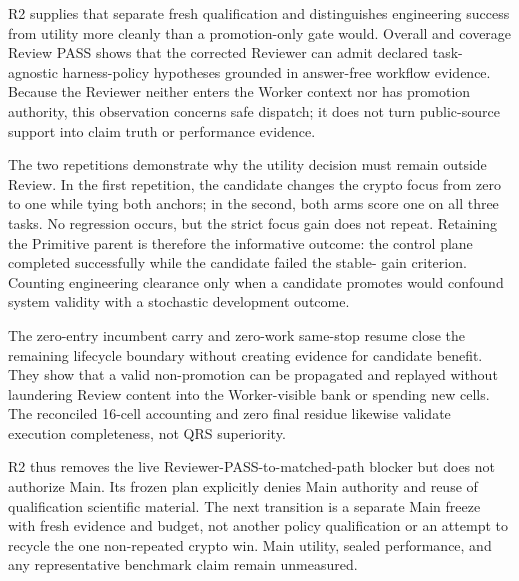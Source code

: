 R2 supplies that separate fresh qualification and distinguishes engineering
success from utility more cleanly than a promotion-only gate would. Overall
and coverage Review PASS shows that the corrected Reviewer can admit declared
task-agnostic harness-policy hypotheses grounded in answer-free workflow
evidence. Because the Reviewer neither enters the Worker context nor has
promotion authority, this observation concerns safe dispatch; it does not
turn public-source support into claim truth or performance evidence.

The two repetitions demonstrate why the utility decision must remain outside
Review. In the first repetition, the candidate changes the crypto focus from
zero to one while tying both anchors; in the second, both arms score one on all
three tasks. No regression occurs, but the strict focus gain does not repeat.
Retaining the Primitive parent is therefore the informative outcome: the
control plane completed successfully while the candidate failed the stable-
gain criterion. Counting engineering clearance only when a candidate promotes
would confound system validity with a stochastic development outcome.

The zero-entry incumbent carry and zero-work same-stop resume close the
remaining lifecycle boundary without creating evidence for candidate benefit.
They show that a valid non-promotion can be propagated and replayed without
laundering Review content into the Worker-visible bank or spending new cells.
The reconciled 16-cell accounting and zero final residue likewise validate
execution completeness, not QRS superiority.

R2 thus removes the live Reviewer-PASS-to-matched-path blocker but does not
authorize Main. Its frozen plan explicitly denies Main authority and reuse of
qualification scientific material. The next transition is a separate Main
freeze with fresh evidence and budget, not another policy qualification or an
attempt to recycle the one non-repeated crypto win. Main utility, sealed
performance, and any representative benchmark claim remain unmeasured.

